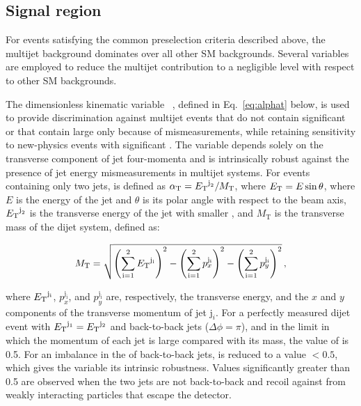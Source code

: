 \subsection{Signal region}
\label{sec:signal_region} 

For events satisfying the common preselection criteria described
above, the multijet background dominates over all other SM
backgrounds. Several variables are employed to reduce the multijet
contribution to a negligible level with respect to other SM
backgrounds.

The dimensionless kinematic variable \alphat~\cite{Randall:2008rw,
  RA1Paper}, defined in Eq.~\ref{eq:alphat} below, is used to provide
discrimination against multijet events that do not contain significant
\ptvecmiss or that contain large \ptvecmiss only because of \Pt
mismeasurements, while retaining sensitivity to new-physics events
with significant \ptvecmiss. The \alphat variable depends solely on
the transverse component of jet four-momenta
and is intrinsically robust against the presence of jet energy
mismeasurements in multijet systems. For events containing only two
jets, \alphat is defined as $\alpha_{\text{T}} = {E_{\text T}}^{\text j_2}/M_\text{T}$,
where ${E_{\text T}} = E\sin\theta$, 
where $E$ is the energy of the jet and $\theta$ is its polar angle
with respect to the beam axis, ${E_{\text T}}^{\text j_2}$ is the transverse
energy of the jet with smaller \Et, and $M_\text{T}$ is the transverse
mass of the dijet system, defined as:

\begin{equation}
  \label{eq:mt}
  M_\text{T} = \sqrt{ \left( \sum_{\textrm{i}=1}^2 {E_{\text T}}^{\mathrm{j_i}}
    \right)^2 - \left( \sum_{\textrm{i}=1}^2 p_x^{\mathrm{j_i}} \right)^2 - \left(
      \sum_{\textrm{i}=1}^2 p_y^{\mathrm{j_i}} \right)^2}\, ,
\end{equation}

where ${E_{\text T}}^{\mathrm{j_i}}$, $p_x^{\mathrm{j_i}}$, and
$p_y^{\mathrm{j_i}}$ are, respectively, the transverse energy, and the
$x$ and $y$ components of the transverse momentum of jet
$\mathrm{j}_i$.
For a perfectly measured dijet event with ${E_{\text T}}^{\mathrm{j_1}} =
{E_{\text T}}^{\mathrm{j_2}}$ and back-to-back jets ($\Delta\phi = \pi$), and in
the limit in which the momentum of each jet is large compared with its
mass, the value of \alphat is 0.5. For an imbalance in the \Et of
back-to-back jets, \alphat is reduced to a value $<0.5$, which gives
the variable its intrinsic robustness. Values significantly greater
than 0.5 are observed when the two jets are not back-to-back and
recoil against \ptvecmiss from weakly interacting particles that
escape the detector.

